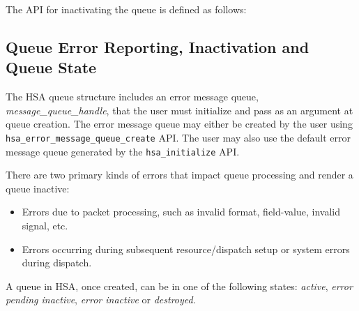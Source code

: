 The API for inactivating the queue is defined as follows:



\hypertarget{queue_errors}{}\subsection{Queue Error Reporting,
Inactivation and Queue State} \label{queueerrors}
The HSA queue structure includes an error message queue, {\itshape
message\_queue\_handle}, that the user must initialize and pass as
an argument at queue creation. The error message queue may either be
created by the user using
\texttt{hsa\_error\_message\_queue\_create} API. The user may also
use the default error message queue generated by the
\texttt{hsa\_initialize} API.

There are two primary kinds of errors that impact queue
processing and render a queue inactive:
\begin{itemize}
        \item Errors due to packet processing, such as invalid
                format, field-value, invalid signal, etc.
        \item Errors occurring during subsequent resource/dispatch
                setup or system errors during dispatch.
\end{itemize}

A queue in HSA, once created, can be in one of the following states:
\emph{active}, \emph{error pending inactive}, \emph{error inactive}
or \emph{destroyed}.

